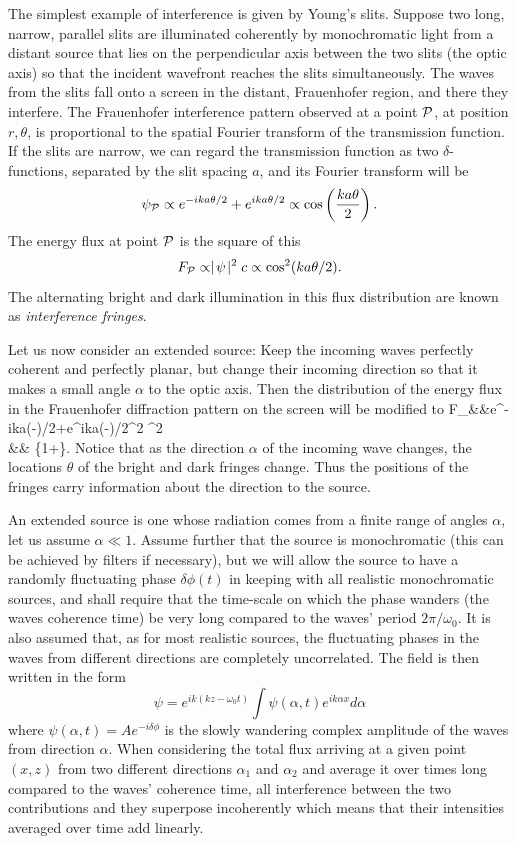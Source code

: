 The simplest example of interference is given by Young's slits. Suppose two long,
narrow, parallel slits are illuminated coherently by monochromatic light from a distant
source that lies on the perpendicular axis between the two slits (the optic axis) so that the incident wavefront reaches the slits simultaneously. The waves from the slits fall onto a screen in the distant, Frauenhofer region, and there they interfere. The Frauenhofer 
interference pattern observed at a point ${\cal P}$, at position $r,\theta$, is proportional to the spatial Fourier transform of the transmission function. If the slits are 
narrow, we can regard the transmission function as two $\delta$-functions, separated
by the slit spacing $a$, and its Fourier transform will be
\[
\psi_{{\cal P}}\propto e^{-ika\theta/2}+e^{ika\theta/2}\propto\cos\left({ka\theta\over 2}\right).
\]
The energy flux at point ${\cal P}$ is the square of this
\[
F_{{\cal P}}\propto\mid\!\psi\!\mid^2c\propto\cos^2({ka\theta/2}).
\]
The alternating bright and dark illumination in this flux distribution are known as {\it interference fringes}. 

Let us now consider an extended source: Keep the incoming waves perfectly 
coherent and perfectly planar, but change their incoming direction so that it makes a small angle $\alpha$ to the optic axis. Then the distribution of the energy flux in the
Frauenhofer diffraction pattern on the screen will be modified to 
\bua
F_{}&\propto&\labs e^{-ika(\theta-\alpha)/2}+e^{ika(\theta-\alpha)/2}\rabs^2
      \propto\cos^2 \\
             &\propto& \{1+\}.
\eua
Notice that as the direction $\alpha$ of the incoming wave changes, the locations $\theta$ of the bright and dark fringes change. Thus the positions of the fringes carry information about the direction to the source. 

An extended source is one whose radiation comes from a finite range of angles $\alpha$, let us assume $\alpha\ll 1$. Assume further that the source is monochromatic (this can be achieved by filters if necessary), but we will allow the source to have a 
randomly fluctuating phase $\delta\phi(t)$ in keeping with all realistic monochromatic sources, and shall require that the time-scale on which the phase wanders (the waves coherence time) be very long compared to the waves' period $2\pi/\omega_0$. It is also assumed that, as for most realistic sources, the fluctuating phases in the waves from different directions are completely uncorrelated. The field is then written in the 
form
\[
\psi=e^{ik(kz-\omega_0t)}\int\psi(\alpha,t)e^{ik\alpha x}d\alpha
\]
where $\psi(\alpha,t)=Ae^{-i\delta\phi}$ is the slowly wandering complex amplitude of the waves from direction $\alpha$. When considering the total flux arriving at a given point $(x,z)$ from two different directions $\alpha_1$ and $\alpha_2$ and average it over times long compared to the waves' coherence time, all interference between the two contributions and they superpose incoherently which means that their intensities averaged over time add linearly.

